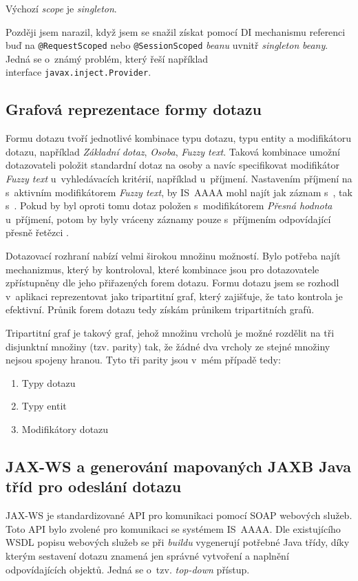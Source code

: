 \documentclass[thesis=M,czech]{FITthesis}[2019/12/23]
\begin{document}
Výchozí \textit{scope} je \textit{singleton}. 

Později jsem narazil, když jsem se snažil získat pomocí DI mechanismu referenci buď na \texttt{@RequestScoped} nebo  \texttt{@SessionScoped} \textit{beanu} uvnitř \textit{singleton} \textit{beany}. Jedná se o~známý problém, který řeší například \\ interface \texttt{javax.inject.Provider}. \cite{InjectIntoSingletonBean}

\subsection{Grafová reprezentace formy dotazu}
Formu dotazu tvoří jednotlivé kombinace typu dotazu, typu entity a modifikátoru dotazu, například \textit{Základní dotaz}, \textit{Osoba}, \textit{Fuzzy text}. Taková kombinace umožní dotazovateli položit standardní dotaz na osoby a navíc specifikovat modifikátor \textit{Fuzzy text} u~vyhledávacích kritérií, například u~příjmení. Nastavením příjmení na  s~aktivním modifikátorem \textit{Fuzzy text}, by IS~AAAA mohl najít jak záznam s~, tak s~. Pokud by byl oproti tomu dotaz položen s~modifikátorem \textit{Přesná hodnota} u~příjmení, potom by byly vráceny záznamy pouze s~příjmením odpovídající přesně řetězci . \cite{Queries}

Dotazovací rozhraní nabízí velmi širokou množinu možností. Bylo potřeba najít mechanizmus, který by kontroloval, které kombinace jsou pro dotazovatele zpřístupněny dle jeho přiřazených forem dotazu. Formu dotazu jsem se rozhodl v~aplikaci reprezentovat jako tripartitní graf, který zajišťuje, že tato kontrola je efektivní. Průnik forem dotazu  tedy získám průnikem tripartitních grafů.
 
Tripartitní graf je takový graf, jehož množinu vrcholů je možné rozdělit na tři disjunktní množiny (tzv. parity) tak, že žádné dva vrcholy ze stejné množiny nejsou spojeny hranou. Tyto tři parity jsou v~mém případě tedy:
\begin{enumerate}
	\item Typy dotazu
	\item Typy entit
	\item Modifikátory dotazu
\end{enumerate}

\subsection{JAX-WS a generování mapovaných JAXB Java tříd pro odeslání dotazu}
JAX-WS je standardizované API pro komunikaci pomocí SOAP webových služeb. Toto API bylo zvolené pro komunikaci se systémem IS~AAAA. Dle existujícího WSDL popisu webových služeb se při \textit{buildu} vygenerují potřebné Java třídy, díky kterým sestavení dotazu znamená jen správné vytvoření a naplnění odpovídajících objektů. Jedná se o~tzv. \textit{top-down} přístup. \cite{JaxWS}
\end{document}
